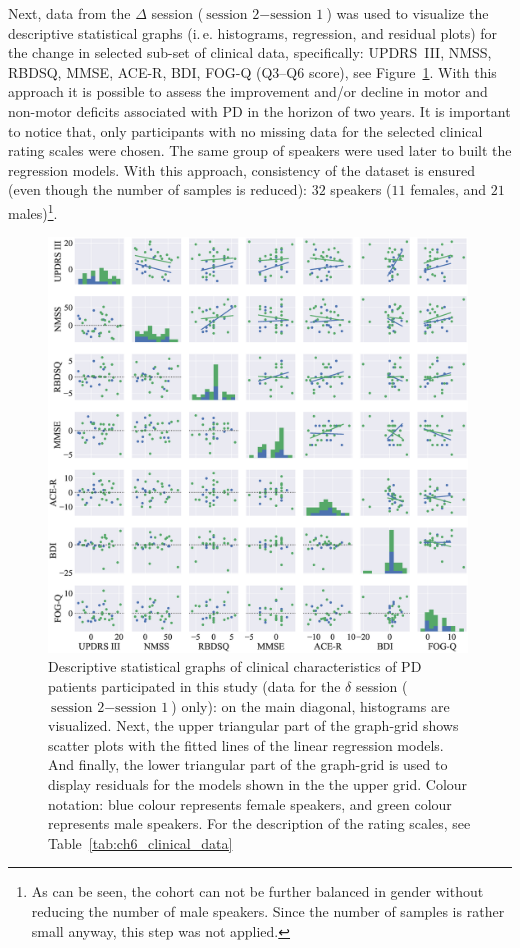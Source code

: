 Next, data from the $\Delta$ session ($\mbox{session 2} - \mbox{session 1}$) was used to visualize the descriptive statistical graphs (i.\,e. histograms, regression, and residual plots) for the change in selected sub-set of clinical data, specifically: UPDRS~III, NMSS, RBDSQ, MMSE, ACE-R, BDI, FOG-Q (Q3--Q6 score), see Figure~\ref{fig:ch6_clinical_statistics}. With this approach it is possible to assess the improvement and/or decline in motor and non-motor deficits associated with PD in the horizon of two years. It is important to notice that, only participants with no missing data for the selected clinical rating scales were chosen. The same group of speakers were used later to built the regression models. With this approach, consistency of the dataset is ensured (even though the number of samples is reduced): $32$ speakers ($11$ females, and $21$ males)\footnote{As can be seen, the cohort can not be further balanced in gender without reducing the number of male speakers. Since the number of samples is rather small anyway, this step was not applied.}.

\begin{figure}[htb!]
	\centering
	\scriptsize
	\includegraphics[width=0.99\textwidth]{pictures/ch6_clinical_statistics.eps}
	\caption[Descriptive statistical graphs of clinical data for PD patients.]{Descriptive statistical graphs of clinical characteristics of PD patients participated in this study (data for the $\delta$ session ($\mbox{session 2} - \mbox{session 1}$) only): on the main diagonal, histograms are visualized. Next, the upper triangular part of the graph-grid shows scatter plots with the fitted lines of the linear regression models. And finally, the lower triangular part of the graph-grid is used to display residuals for the models shown in the the upper grid. Colour notation: blue colour represents female speakers, and green colour represents male speakers. For the description of the rating scales, see Table~\ref{tab:ch6_clinical_data}}
	\label{fig:ch6_clinical_statistics}
\end{figure}

